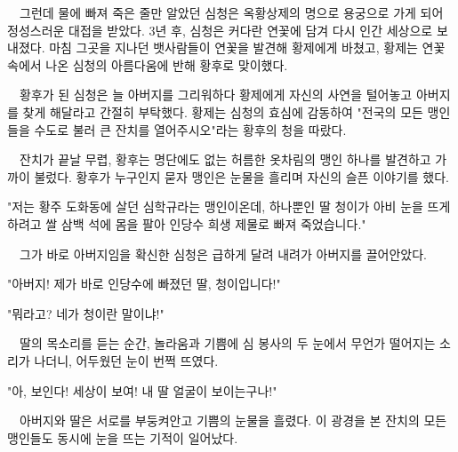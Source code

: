 \documentclass[fs9,seriesRus]{korfarm-base}
\begin{document}
{　그런데 물에 빠져 죽은 줄만 알았던 심청은 옥황상제의 명으로 용궁으로 가게 되어 정성스러운 대접을 받았다. 3년 후, 심청은 커다란 연꽃에 담겨 다시 인간 세상으로 보내졌다. 마침 그곳을 지나던 뱃사람들이 연꽃을 발견해 황제에게 바쳤고, 황제는 연꽃 속에서 나온 심청의 아름다움에 반해 황후로 맞이했다.

　황후가 된 심청은 늘 아버지를 그리워하다 황제에게 자신의 사연을 털어놓고 아버지를 찾게 해달라고 간절히 부탁했다. 황제는 심청의 효심에 감동하여 "전국의 모든 맹인들을 수도로 불러 큰 잔치를 열어주시오"라는 황후의 청을 따랐다.

　잔치가 끝날 무렵, 황후는 명단에도 없는 허름한 옷차림의 맹인 하나를 발견하고 가까이 불렀다. 황후가 누구인지 묻자 맹인은 눈물을 흘리며 자신의 슬픈 이야기를 했다.

"저는 황주 도화동에 살던 심학규라는 맹인이온데, 하나뿐인 딸 청이가 아비 눈을 뜨게 하려고 쌀 삼백 석에 몸을 팔아 인당수 희생 제물로 빠져 죽었습니다."

　그가 바로 아버지임을 확신한 심청은 급하게 달려 내려가 아버지를 끌어안았다.

"아버지! 제가 바로 인당수에 빠졌던 딸, 청이입니다!"

"뭐라고? 네가 청이란 말이냐!"

　딸의 목소리를 듣는 순간, 놀라움과 기쁨에 심 봉사의 두 눈에서 무언가 떨어지는 소리가 나더니, 어두웠던 눈이 번쩍 뜨였다.

"아, 보인다! 세상이 보여! 내 딸 얼굴이 보이는구나!"

　아버지와 딸은 서로를 부둥켜안고 기쁨의 눈물을 흘렸다. 이 광경을 본 잔치의 모든 맹인들도 동시에 눈을 뜨는 기적이 일어났다.
}


\end{document}
